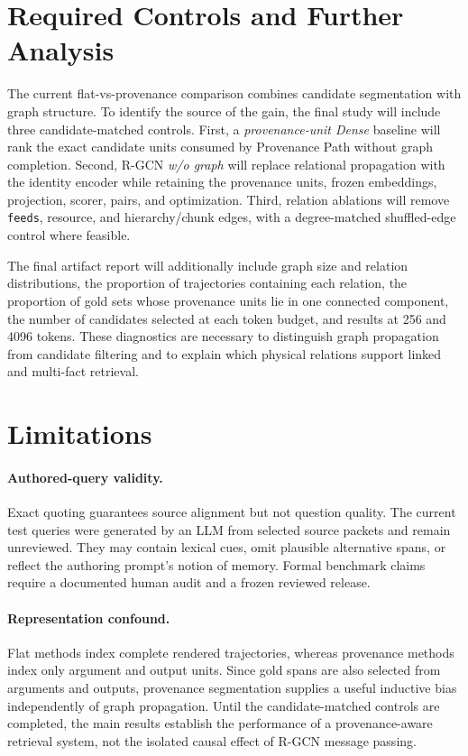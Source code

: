 \documentclass[sigconf,anonymous,review]{acmart}
\begin{document}
\section{Required Controls and Further Analysis}
\label{sec:controls}

The current flat-vs-provenance comparison combines candidate segmentation with graph structure. To identify the source of the gain, the final study will include three candidate-matched controls. First, a \emph{provenance-unit Dense} baseline will rank the exact candidate units consumed by Provenance Path without graph completion. Second, R-GCN \emph{w/o graph} will replace relational propagation with the identity encoder while retaining the provenance units, frozen embeddings, projection, scorer, pairs, and optimization. Third, relation ablations will remove \texttt{feeds}, resource, and hierarchy/chunk edges, with a degree-matched shuffled-edge control where feasible.

The final artifact report will additionally include graph size and relation distributions, the proportion of trajectories containing each relation, the proportion of gold sets whose provenance units lie in one connected component, the number of candidates selected at each token budget, and results at 256 and 4096 tokens. These diagnostics are necessary to distinguish graph propagation from candidate filtering and to explain which physical relations support linked and multi-fact retrieval.

\section{Limitations}
\label{sec:limitations}

\paragraph{Authored-query validity.}
Exact quoting guarantees source alignment but not question quality. The current test queries were generated by an LLM from selected source packets and remain unreviewed. They may contain lexical cues, omit plausible alternative spans, or reflect the authoring prompt's notion of memory. Formal benchmark claims require a documented human audit and a frozen reviewed release.

\paragraph{Representation confound.}
Flat methods index complete rendered trajectories, whereas provenance methods index only argument and output units. Since gold spans are also selected from arguments and outputs, provenance segmentation supplies a useful inductive bias independently of graph propagation. Until the candidate-matched controls are completed, the main results establish the performance of a provenance-aware retrieval system, not the isolated causal effect of R-GCN message passing.
\end{document}
